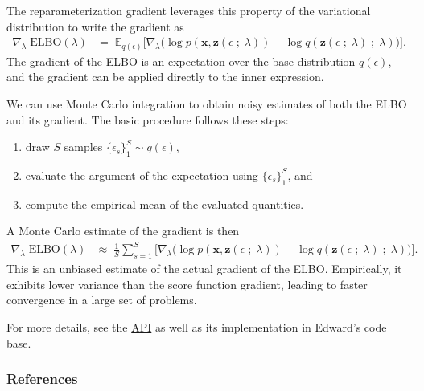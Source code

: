 The reparameterization gradient leverages this property of the
variational distribution to write the gradient as
\begin{align*}
  \nabla_\lambda\;
  \text{ELBO}(\lambda)
  &=\;
  \mathbb{E}_{q(\epsilon)}
  \big[
  \nabla_\lambda
  \big(
  \log p(\mathbf{x}, \mathbf{z}(\epsilon \;;\; \lambda))
  -
  \log q(\mathbf{z}(\epsilon \;;\; \lambda) \;;\;\lambda)
  \big)
  \big].
\end{align*}
The gradient of the ELBO is an expectation over the base
distribution $q(\epsilon)$, and the gradient can be applied directly
to the inner expression.

We can use Monte Carlo integration to obtain noisy estimates of both the ELBO
and its gradient. The basic procedure follows these steps:
\begin{enumerate}
  \item draw $S$ samples $\{\epsilon_s\}_1^S \sim q(\epsilon)$,
  \item evaluate the argument of the expectation using $\{\epsilon_s\}_1^S$, and
  \item compute the empirical mean of the evaluated quantities.
\end{enumerate}

A Monte Carlo estimate of the gradient is then
\begin{align*}
  \nabla_\lambda\;
  \text{ELBO}(\lambda)
  &\approx\;
  \frac{1}{S}
  \sum_{s=1}^{S}
  \big[
  \nabla_\lambda
  \big(
  \log p(\mathbf{x}, \mathbf{z}(\epsilon \;;\; \lambda))
  -
  \log q(\mathbf{z}(\epsilon \;;\; \lambda) \;;\;\lambda)
  \big)
  \big].
\end{align*}
This is an unbiased estimate of the actual gradient of the ELBO. Empirically, it
exhibits lower variance than the
score function gradient, leading to
faster convergence in a large set of problems.

For more details, see the \href{/api/}{API} as well as its
implementation in Edward's code base.

\subsubsection{References}\label{references}
